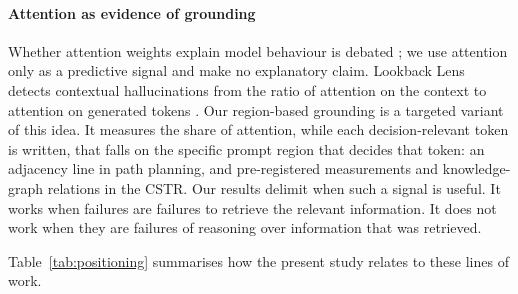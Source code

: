 \paragraph{Attention as evidence of grounding}
Whether attention weights explain model behaviour is debated \citep{jain2019attention,wiegreffe2019attention};
we use attention only as a predictive signal and make no explanatory claim. Lookback Lens detects contextual
hallucinations from the ratio of attention on the context to attention on generated tokens
\citep{chuang2024lookback}. Our region-based grounding is a targeted variant of this idea. It measures the share
of attention, while each decision-relevant token is written, that falls on the specific prompt region that
decides that token: an adjacency line in path planning, and pre-registered measurements and knowledge-graph
relations in the CSTR. Our results delimit when such a signal is useful. It works when failures are failures to
retrieve the relevant information. It does not work when they are failures of reasoning over information that
was retrieved.

Table~\ref{tab:positioning} summarises how the present study relates to these lines of work.

\begin{table}[!htbp]
\centering
\small
\caption{Positioning of this study. \checkmark: addressed; (\checkmark): partially addressed; --: not addressed.}
\label{tab:positioning}
\end{table}
